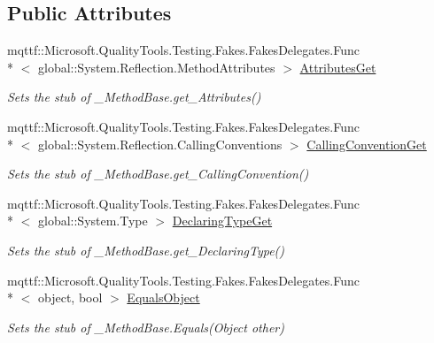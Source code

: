 \subsection*{Public Attributes}
\begin{DoxyCompactItemize}
\item 
mqttf\-::\-Microsoft.\-Quality\-Tools.\-Testing.\-Fakes.\-Fakes\-Delegates.\-Func\\*
$<$ global\-::\-System.\-Reflection.\-Method\-Attributes $>$ \hyperlink{class_system_1_1_runtime_1_1_interop_services_1_1_fakes_1_1_stub___method_base_a096f51cd8927041491ff304730ae741c}{Attributes\-Get}
\begin{DoxyCompactList}\small\item\em Sets the stub of \-\_\-\-Method\-Base.\-get\-\_\-\-Attributes()\end{DoxyCompactList}\item 
mqttf\-::\-Microsoft.\-Quality\-Tools.\-Testing.\-Fakes.\-Fakes\-Delegates.\-Func\\*
$<$ global\-::\-System.\-Reflection.\-Calling\-Conventions $>$ \hyperlink{class_system_1_1_runtime_1_1_interop_services_1_1_fakes_1_1_stub___method_base_a5838c0c4ab17780b1e1eacdf9e10e8d3}{Calling\-Convention\-Get}
\begin{DoxyCompactList}\small\item\em Sets the stub of \-\_\-\-Method\-Base.\-get\-\_\-\-Calling\-Convention()\end{DoxyCompactList}\item 
mqttf\-::\-Microsoft.\-Quality\-Tools.\-Testing.\-Fakes.\-Fakes\-Delegates.\-Func\\*
$<$ global\-::\-System.\-Type $>$ \hyperlink{class_system_1_1_runtime_1_1_interop_services_1_1_fakes_1_1_stub___method_base_a642414305d93420abcbcef1bb1f1545e}{Declaring\-Type\-Get}
\begin{DoxyCompactList}\small\item\em Sets the stub of \-\_\-\-Method\-Base.\-get\-\_\-\-Declaring\-Type()\end{DoxyCompactList}\item 
mqttf\-::\-Microsoft.\-Quality\-Tools.\-Testing.\-Fakes.\-Fakes\-Delegates.\-Func\\*
$<$ object, bool $>$ \hyperlink{class_system_1_1_runtime_1_1_interop_services_1_1_fakes_1_1_stub___method_base_a7d64de013b624f1dc6d45e7190027771}{Equals\-Object}
\begin{DoxyCompactList}\small\item\em Sets the stub of \-\_\-\-Method\-Base.\-Equals(\-Object other)\end{DoxyCompactList}\item 

\end{DoxyCompactItemize}
